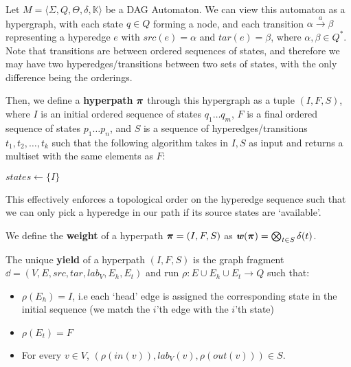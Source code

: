 \documentclass[11pt]{article}
\begin{document}
\begin{definition}\label{def:automatahyperpaths}
  
  Let $M =  \langle \Sigma, Q, \Theta, \delta, \mathbb{K}\rangle$ be a DAG
  Automaton. We can view this automaton as a hypergraph, with each state $q \in
  Q$ forming a node, and each transition $\alpha\overset{a}{\rightarrow}\beta$
  representing a hyperedge $e$ with $src(e) = \alpha$ and $tar(e) = \beta$,
  where $\alpha,\beta \in Q^*$. Note that transitions are between ordered
  sequences of states, and therefore we may have two hyperedges/transitions
  between two sets of states, with the only difference being the orderings. 

  
  Then, we define a \textbf{hyperpath} $\boldsymbol{\pi}$ through this hypergraph as a tuple
  $(I,F,S)$, where $I$ is an initial ordered sequence of states $q_1\ldots q_m$,
  $F$ is a final ordered sequence of states $p_1\ldots p_n$, and $S$ is a
  sequence of hyperedges/transitions $t_1,t_2,\ldots,t_k$ such that the
  following algorithm takes in $I,S$ as input and returns a multiset with the
  same elements as $F$:

  \begin{algorithm*}[H]
    \caption{$\textsc{HyperpathTraversal}(I,S)$}
	  \label{alg:hyperpathTraversal}
    $states \gets \{I\}$   
  \end{algorithm*}
  
  This effectively enforces a topological order on the hyperedge sequence such
  that we can only pick a hyperedge in our path if its source states are
  `available'.

  We define the \textbf{weight} of a hyperpath $\boldsymbol{\pi} = (I,F,S)$ as $\boldsymbol{\mathit{w}}(\boldsymbol{\pi}) =
  \bigotimes_{t \in S} \delta(t)$. 
\end{definition}

\begin{definition}\label{def:hyperpathyield}

  The unique \textbf{yield} of a hyperpath $(I,F,S)$ is the graph fragment $\dd
  = (V,E,src,tar,lab_V,E_h,E_t)$ and run $\rho: E \cup E_h \cup E_t \rightarrow
  Q$ such that:
  \begin{itemize}
    \item $\rho(E_h) = I$, i.e each `head' edge is assigned the corresponding
    state in the initial sequence (we match the $i$'th edge with the $i$'th
    state)
    \item $\rho(E_t) = F$
    \item For every $v \in V$, $(\rho(in(v)), lab_V(v), \rho(out(v)) )\in S$.
  \end{itemize}
\end{definition}
\end{document}
